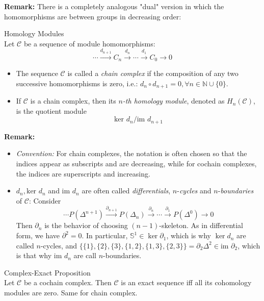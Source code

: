 \noindent\textbf{Remark:} There is a completely analogous "dual" version in which the homomorphisms are between groups in decreasing order:

\begin{definition}{Homology Modules}\\
Let $\mathcal{C}$ be a sequence of module homomorphisms:
\[
\cdots \overset{d_{n+1}}{\longrightarrow} C_n \overset{d_n}{\longrightarrow} \cdots \overset{d_1}{\longrightarrow} C_0 \to 0
\]
\begin{itemize}
    \item The sequence $\mathcal{C}$ is called a \textit{chain complex} if the composition of any two successive homomorphisms is zero, i.e.: $d_n \circ d_{n+1}=0 ,\forall n\in \mathbb{N} \cup \{0\}$.

    \item If $\mathcal{C}$ is a chain complex, then its \textit{$n$-th homology module}, denoted as $H_n(\mathcal{C})$, is the quotient module
    \[
    \text{ker } d_n /\text{im }d_{n+1}
    \]
\end{itemize}
\end{definition}


\noindent\textbf{Remark:} \begin{itemize}
    \item \textit{Convention:} For chain complexes, the notation is often chosen so that the indices appear as subscripts and are decreasing, while for cochain complexes, the indices are superscripts and increasing.

    \item $d_n, \text{ker }d_n$ and $\text{im }d_n$ are often called \textit{differentials}, $n$-\textit{cycles} and $n$-\textit{boundaries} of $\mathcal{C}$: Consider
    \[
    \cdots P(\Delta^{n+1}) \xrightarrow{\partial_{n+1}} P(\Delta_n) \xrightarrow{\partial_n} \cdots \xrightarrow{\partial_1} P(\Delta^0) \to 0
    \]
    Then $\partial_n$ is the behavior of choosing $(n-1)$-skeleton. As in differential form, we have $\partial^2=0$. In particular, $\mathbb{S}^1 \in \ker \partial_1$, which is why $\ker d_n$ are called $n$-cycles, and $\{ \{1\}, \{2\}, \{3\}, \{1,2\} ,\{1,3\}, \{2,3\} \}= \partial_2 \Delta^2 \in \text{im }\partial_2$, which is that why $\text{im }d_n$ are call $n$-boundaries.
\end{itemize}

\begin{proposition}{Complex-Exact Proposition}\\
Let $\mathcal{C}$ be a cochain complex. Then $\mathcal{C}$ is an exact sequence iff all its cohomology modules are zero. Same for chain complex.
\end{proposition}

